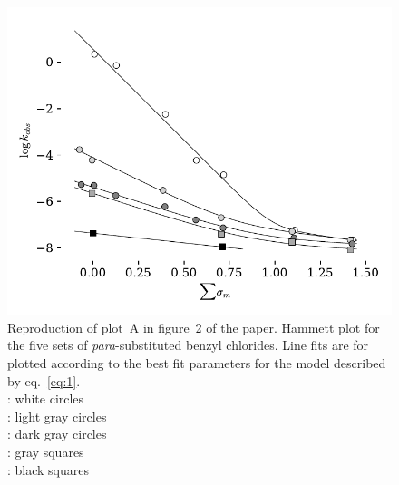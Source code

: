 \documentclass{tufte-handout}
\begin{document}
\begin{figure}[h!]
  \centering
  \includegraphics[scale=0.8]{images/plot2.pdf}
  \caption[-0mm]{Reproduction of plot~A in figure~2 of the paper. Hammett plot for the five sets of \textit{para}-substituted benzyl chlorides. Line fits are for plotted according to the best fit parameters for the model described by eq.~\ref{eq:1}. \vspace{2mm} \\
  : white circles  \\
  : light gray circles  \\
  : dark gray circles  \\
  : gray squares   \\
  : black squares  \\
  
 } 
  \label{fig:fig2left_MyOwn}
\end{figure}
\end{document}
